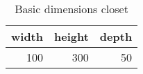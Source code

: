 \begin{table}[h!]
\centering
\caption{Basic dimensions closet}
\begin{tabular}{rrr}
\toprule
 width &  height &  depth \\
\midrule
   100 &     300 &     50 \\
\bottomrule
\end{tabular}
\end{table}
